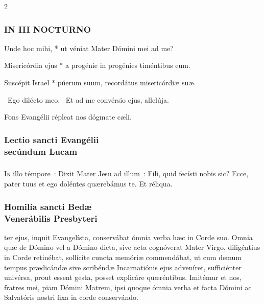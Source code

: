 \documentclass[9pt,twoside]{extarticle}
\begin{document}
\begin{multicols}{2}
\subsubsection*{\center \small \textsc{IN III NOCTURNO}}

\smallskip
{} Unde hoc mihi, * ut véniat Mater Dómini mei ad me?

 Misericórdia ejus * a progénie in progénies timéntibus eum.

 Suscépit Israel * púerum suum, recordátus misericórdiæ suæ.

\smallskip
{}~Ego dilécto meo. ~Et ad me convérsio ejus, allelúja.

\smallskip
{\small {} Fons Evangélii répleat nos dógmate cæli.}


\subsubsection*{\center \normalfont Lectio sancti Evangélii\\ secúndum Lucam}
\subsubsection*{\center \normalfont {}}
\lettrine{I}{n} illo témpore~: Dixit Mater Jesu ad illum~: Fili, quid fecísti nobis sic? Ecce, pater tuus et ego doléntes quærebámus te. Et réliqua.

\subsubsection*{\center \normalfont Homilía sancti Bedæ\\ Venerábilis Presbyteri\\ \small {}}

\smallskip
{}ter ejus, inquit Evangelísta, conservábat ómnia verba hæc in Corde suo. Omnia quæ de Dómino vel a Dómino dicta, sive acta cognóverat Mater Virgo, diligéntius in Corde retinébat, sollícite cuncta memóriæ commendábat, ut cum demum tempus prædicándæ sive scribéndæ Incarnatiónis ejus adveníret, sufficiénter univérsa, prout essent gesta, posset explicáre quæréntibus. Imitémur et nos, fratres mei, piam Dómini Matrem, ipsi quoque ómnia verba et facta Dómini ac Salvatóris nostri fixa in corde conservándo.


\end{multicols}
\end{document}
